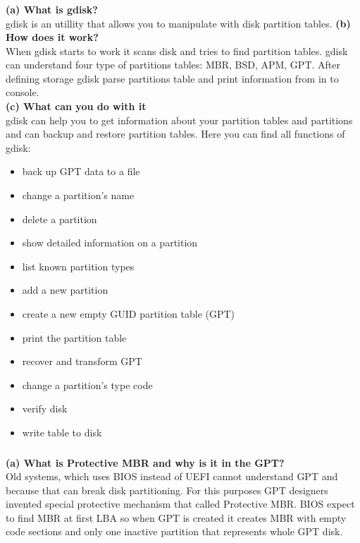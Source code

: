 \documentclass[a4paper,11pt]{article}
\theoremstyle{mytheor}
\begin{document}
\subsubsection{}
\textbf{(a) What is gdisk?}\\
gdisk is an utillity that allows you to manipulate with disk partition tables.
\textbf{(b) How does it work?}\\
When gdisk starts to work it scans disk and tries to find partition tables. gdisk can understand four type of partitions tables: MBR, BSD, APM, GPT. After defining storage gdisk parse partitions table and print information from in to console.\\
\textbf{(c) What can you do with it}\\
gdisk can help you to get information about your partition tables and partitions and can backup and restore partition tables. Here you can find all functions of gdisk: \\
\begin{itemize}
  \item back up GPT data to a file
  \item change a partition's name
  \item delete a partition
  \item show detailed information on a partition
  \item list known partition types
  \item add a new partition
  \item create a new empty GUID partition table (GPT)
  \item print the partition table
  \item recover and transform GPT
  \item change a partition's type code
  \item verify disk
  \item write table to disk
\end{itemize}

\subsubsection{}
\textbf{(a) What is Protective MBR and why is it in the GPT?}\\
Old systems, which uses BIOS instead of UEFI cannot understand GPT and because that can break disk partitioning. For this purposes GPT designers invented special protective mechanism that called Protective MBR. BIOS expect to find MBR at first LBA so when GPT is created it creates MBR with empty code sections and only one inactive partition that represents whole GPT disk.
\end{document}
